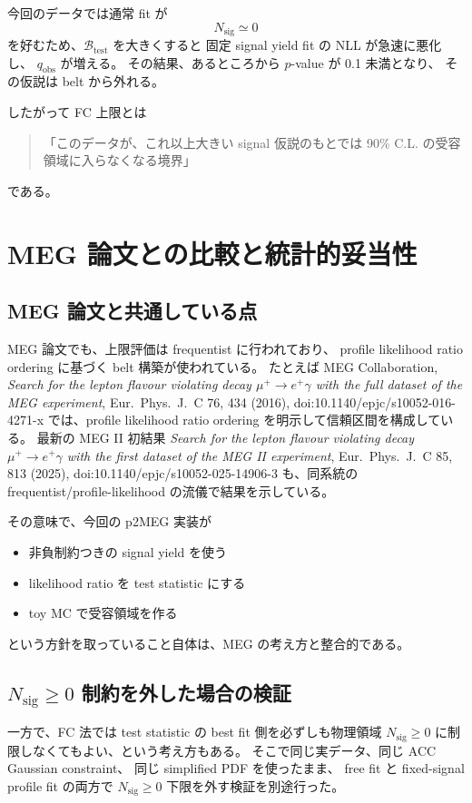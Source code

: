 \documentclass[a4paper,11pt]{jsarticle}
\begin{document}
今回のデータでは通常 fit が
\[
N_{\mathrm{sig}}\simeq 0
\]
を好むため、\(\mathcal{B}_{\mathrm{test}}\) を大きくすると
固定 signal yield fit の NLL が急速に悪化し、
\(q_{\mathrm{obs}}\) が増える。
その結果、あるところから \(p\)-value が 0.1 未満となり、
その仮説は belt から外れる。

したがって FC 上限とは
\begin{quote}
「このデータが、これ以上大きい signal 仮説のもとでは 90\% C.L. の受容領域に入らなくなる境界」
\end{quote}
である。

\section{MEG 論文との比較と統計的妥当性}
\subsection{MEG 論文と共通している点}
MEG 論文でも、上限評価は frequentist に行われており、
profile likelihood ratio ordering に基づく belt 構築が使われている。
たとえば MEG Collaboration,
\emph{Search for the lepton flavour violating decay \(\mu^+\to e^+\gamma\) with the full dataset of the MEG experiment},
Eur.\ Phys.\ J.\ C 76, 434 (2016), doi:10.1140/epjc/s10052-016-4271-x
では、profile likelihood ratio ordering を明示して信頼区間を構成している。
最新の MEG II 初結果
\emph{Search for the lepton flavour violating decay \(\mu^+\to e^+\gamma\) with the first dataset of the MEG II experiment},
Eur.\ Phys.\ J.\ C 85, 813 (2025), doi:10.1140/epjc/s10052-025-14906-3
も、同系統の frequentist/profile-likelihood の流儀で結果を示している。

その意味で、今回の p2MEG 実装が
\begin{itemize}
  \item 非負制約つきの signal yield を使う
  \item likelihood ratio を test statistic にする
  \item toy MC で受容領域を作る
\end{itemize}
という方針を取っていること自体は、MEG の考え方と整合的である。

\subsection{\(N_{\mathrm{sig}}\ge 0\) 制約を外した場合の検証}
一方で、FC 法では test statistic の best fit 側を必ずしも物理領域
\(N_{\mathrm{sig}}\ge 0\)
に制限しなくてもよい、という考え方もある。
そこで同じ実データ、同じ ACC Gaussian constraint、
同じ simplified PDF を使ったまま、
free fit と fixed-signal profile fit の両方で
\(N_{\mathrm{sig}}\ge 0\)
下限を外す検証を別途行った。
\end{document}
